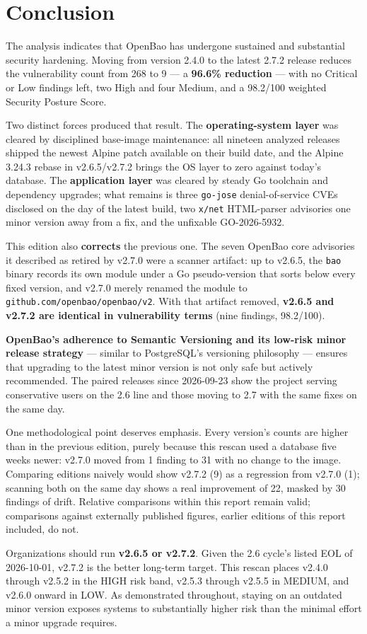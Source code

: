 \documentclass{article}
\begin{document}
\section{Conclusion}
The analysis indicates that OpenBao has undergone sustained and substantial security hardening. Moving from version 2.4.0 to the latest 2.7.2 release reduces the vulnerability count from 268 to 9 --- a \textbf{96.6\% reduction} --- with no Critical or Low findings left, two High and four Medium, and a 98.2/100 weighted Security Posture Score.

Two distinct forces produced that result. The \textbf{operating-system layer} was cleared by disciplined base-image maintenance: all nineteen analyzed releases shipped the newest Alpine patch available on their build date, and the Alpine 3.24.3 rebase in v2.6.5/v2.7.2 brings the OS layer to zero against today's database. The \textbf{application layer} was cleared by steady Go toolchain and dependency upgrades; what remains is three \texttt{go-jose} denial-of-service CVEs disclosed on the day of the latest build, two \texttt{x/net} HTML-parser advisories one minor version away from a fix, and the unfixable GO-2026-5932.

This edition also \textbf{corrects} the previous one. The seven OpenBao core advisories it described as retired by v2.7.0 were a scanner artifact: up to v2.6.5, the \texttt{bao} binary records its own module under a Go pseudo-version that sorts below every fixed version, and v2.7.0 merely renamed the module to \nolinkurl{github.com/openbao/openbao/v2}. With that artifact removed, \textbf{v2.6.5 and v2.7.2 are identical in vulnerability terms} (nine findings, 98.2/100).

\textbf{OpenBao's adherence to Semantic Versioning and its low-risk minor release strategy} --- similar to PostgreSQL's versioning philosophy --- ensures that upgrading to the latest minor version is not only safe but actively recommended. The paired releases since 2026-09-23 show the project serving conservative users on the 2.6 line and those moving to 2.7 with the same fixes on the same day.

One methodological point deserves emphasis. Every version's counts are higher than in the previous edition, purely because this rescan used a database five weeks newer: v2.7.0 moved from 1 finding to 31 with no change to the image. Comparing editions naively would show v2.7.2 (9) as a regression from v2.7.0 (1); scanning both on the same day shows a real improvement of 22, masked by 30 findings of drift. Relative comparisons within this report remain valid; comparisons against externally published figures, earlier editions of this report included, do not.

Organizations should run \textbf{v2.6.5 or v2.7.2}. Given the 2.6 cycle's listed EOL of 2026-10-01, v2.7.2 is the better long-term target. This rescan places v2.4.0 through v2.5.2 in the HIGH risk band, v2.5.3 through v2.5.5 in MEDIUM, and v2.6.0 onward in LOW. As demonstrated throughout, staying on an outdated minor version exposes systems to substantially higher risk than the minimal effort a minor upgrade requires.
\end{document}
